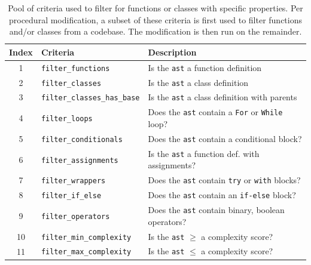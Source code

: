 \begin{table}[t]
    \centering
    \begin{tabular}{cl|l}
    \toprule
Index & Criteria & Description \\
    \midrule
1 & \texttt{filter\_functions} & Is the \texttt{ast} a function definition \\
2 & \texttt{filter\_classes} & Is the \texttt{ast} a class definition \\
3 & \texttt{filter\_classes\_has\_base} & Is the \texttt{ast} a class definition with parents \\
4 & \texttt{filter\_loops} & Does the \texttt{ast} contain a \texttt{For} or \texttt{While} loop? \\
5 & \texttt{filter\_conditionals} & Does the \texttt{ast} contain a conditional block? \\
6 & \texttt{filter\_assignments} & Is the \texttt{ast} a function def. with assignments? \\
7 & \texttt{filter\_wrappers} & Does the \texttt{ast} contain \texttt{try} or \texttt{with} blocks?  \\
8 & \texttt{filter\_if\_else} & Does the \texttt{ast} contain an \texttt{if-else} block? \\
9 & \texttt{filter\_operators} & Does the \texttt{ast} contain binary, boolean operators? \\
10 & \texttt{filter\_min\_complexity} & Is the \texttt{ast} $\geq$ a complexity score? \\
11 & \texttt{filter\_max\_complexity} & Is the \texttt{ast} $\leq$ a complexity score? \\
    \bottomrule
    \end{tabular}
    \caption{
    Pool of criteria used to filter for functions or classes with specific properties.
    Per procedural modification, a subset of these criteria is first used to filter functions and/or classes from a codebase.
    The modification is then run on the remainder.
    }
    \label{tab:pm_criteria}
\end{table}